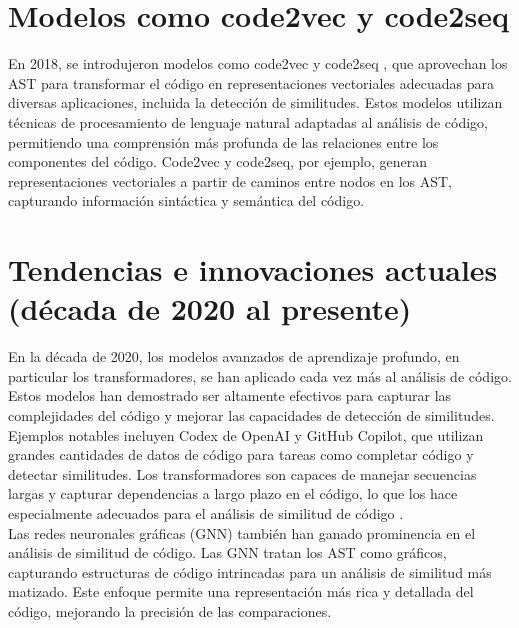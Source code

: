\section*{\textbf{Modelos como code2vec y code2seq}}
En 2018, se introdujeron modelos como code2vec \cite{alon2019code2vec} y code2seq \cite{alon2019code2seq}, que aprovechan los AST para transformar el código en representaciones vectoriales adecuadas para diversas aplicaciones, incluida la detección de similitudes. Estos modelos utilizan técnicas de procesamiento de lenguaje natural adaptadas al análisis de código, permitiendo una comprensión más profunda de las relaciones entre los componentes del código. Code2vec y code2seq, por ejemplo, generan representaciones vectoriales a partir de caminos entre nodos en los AST, capturando información sintáctica y semántica del código.

\section*{\textbf{Tendencias e innovaciones actuales (década de 2020 al presente)}}
En la década de 2020, los modelos avanzados de aprendizaje profundo, en particular los transformadores, se han aplicado cada vez más al análisis de código. Estos modelos han demostrado ser altamente efectivos para capturar las complejidades del código y mejorar las capacidades de detección de similitudes. \\

Ejemplos notables incluyen Codex de OpenAI y GitHub Copilot, que utilizan grandes cantidades de datos de código para tareas como completar código y detectar similitudes. Los transformadores son capaces de manejar secuencias largas y capturar dependencias a largo plazo en el código, lo que los hace especialmente adecuados para el análisis de similitud de código \cite{vaswani2017attention}. \\

Las redes neuronales gráficas (GNN) también han ganado prominencia en el análisis de similitud de código. Las GNN tratan los AST como gráficos, capturando estructuras de código intrincadas para un análisis de similitud más matizado. Este enfoque permite una representación más rica y detallada del código, mejorando la precisión de las comparaciones.

